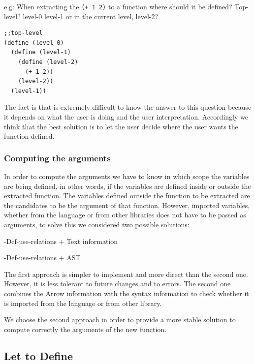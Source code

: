 e.g: When extracting the {\tt (+ 1 2)} to a function where should it be defined?
Top-level? level-0 level-1 or in the current level, level-2?
\begin{lstlisting}[basicstyle=\ttfamily, caption="Extract function levels"]
;;top-level
(define (level-0)
  (define (level-1)
    (define (level-2)
      (+ 1 2))
    (level-2))
  (level-1))
\end{lstlisting}

The fact is that is extremely difficult to know the answer to this question because
it depends on what the user is doing and the user interpretation.
Accordingly we think that the best solution is to let the user decide where
the user wants the function defined.


\subsubsection{Computing the arguments}

In order to compute the arguments we have to know in which scope the variables are being defined, in other words,
if the variables are defined inside or outside the extracted function. %
The variables defined outside the function to be extracted are the candidates to be the argument %
of that function.
However, imported variables, whether from the language or from other libraries
does not have to be passed as arguments, to solve this we considered two possible solutions:

  -Def-use-relations + Text information

  -Def-use-relations + AST

The first approach is simpler to implement and more direct than the second one.
However, it is less tolerant to future changes and to errors.
The second one combines the Arrow information with the syntax information to
check whether it is imported from the language or from other library.

We choose the second approach in order to provide a more stable solution to compute
 correctly the arguments of the new function.

\subsection{Let to Define} %

